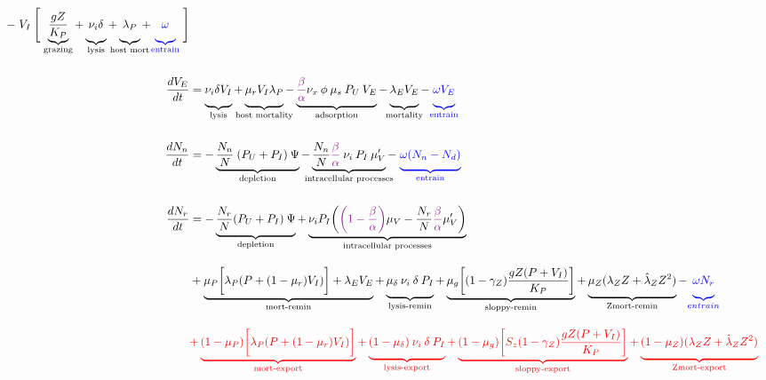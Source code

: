 \documentclass{article}
\begin{document}
\begin{align}
    - \; V_I \: \Biggl[\; \underbrace{\frac{g Z}{K_P}}_{\textrm{grazing}} 
    + \underbrace{\vphantom{\frac{g Z}{K_P}} \nu_i \delta }_{\textrm{lysis}}
    + \underbrace{\vphantom{\frac{g Z}{K_P}} \lambda_P }_{\mathclap{\textrm{host mort}}} 
    + {\color{blue}\underbrace{\vphantom{\frac{g Z}{K_P}} \omega }_{\textrm{entrain}}} \; \Biggr] \\[15pt]
    \frac{dV_E}{dt} &= \underbrace{\vphantom{\frac{g Z}{K_P}} \nu_i \delta V_I}_{\text{lysis}} + \underbrace{\vphantom{\frac{g Z}{K_P}} \mu_r V_I \lambda_P }_{\mathclap{\text{host mortality}}}
    - \underbrace{\vphantom{\frac{g Z}{K_P}} \textcolor{Plum}{\frac{\beta}{\alpha}} \nu_x \: \phi \: \mu_s \: P_U \: V_E}_{\text{adsorption}}
    - \underbrace{\vphantom{\frac{g Z}{K_P}} \lambda_E V_E}_{\mathclap{\text{mortality}}} 
    - {\color{blue}\underbrace{\vphantom{\frac{g Z}{K_P}} \omega V_E}_{\text{entrain}}} \\[15pt]
    \frac{dN_n}{dt} &= - \underbrace{\frac{N_n}{N} \: (P_U + P_I) \: \Psi}_{\text{depletion}}
    - \underbrace{\frac{N_n}{N} \textcolor{Plum}{\frac{\beta}{\alpha}} \: \nu_i \: P_I  \: \mu_V'}_{\mathclap{\text{intracellular processes}}} 
    - \; {\color{blue} \underbrace{\vphantom{\frac{N_n}{N}} \omega(N_n-N_{d})}_{\text{entrain}}} \\[15pt]
    \frac{dN_r}{dt} &=  - \underbrace{\vphantom{\frac{g Z}{K_P}} \frac{N_r}{N} (P_U +  P_I) \: \Psi}_{\text{depletion}}
    + \underbrace{\vphantom{\frac{g Z}{K_P}} \nu_i P_I \biggl(\textcolor{Plum}{\biggl(1 -  \frac{\beta}{\alpha} \biggr)} \mu_V -  \frac{N_r}{N} \textcolor{Plum}{\frac{\beta}{\alpha}} \mu_V' \biggr)}_{\text{intracellular processes}} \\[10pt] 
    &+ \underbrace{\vphantom{\frac{g Z}{K_P}} \mu_P \biggl[ \lambda_P (P + (1- \mu_r) V_I) \biggr] + \lambda_E V_E}_{\text{mort-remin}} 
    + \underbrace{\vphantom{\frac{g Z}{K_P}} \mu_{\delta} \: \nu_i \: \delta \: P_I  }_{\text{lysis-remin}} 
    + \underbrace{\vphantom{\frac{g Z}{K_P}} \mu_g \biggl[(1 -  \gamma_Z) \frac{g Z (P+V_I)}{K_P} \biggr]}_{\text{sloppy-remin}} 
    + \underbrace{\vphantom{\frac{g Z}{K_P}} \mu_Z(\lambda_Z Z + \hat{\lambda}_Z Z^{2})}_{\text{Zmort-remin}} 
    - {\color{blue}\underbrace{\vphantom{\frac{g Z}{K_P}} \omega N_r}_{entrain}} \nonumber \\[10pt]  
    & {\color{red} + \underbrace{\vphantom{\frac{g Z}{K_P}} (1 - \mu_P) \biggl[ \lambda_P (P +  (1 - \mu_r) V_I) \biggr]}_{\text{mort-export}} 
    + \underbrace{\vphantom{\frac{g Z}{K_P}} (1 - \mu_{\delta}) \: \nu_i \: \delta \: P_I}_{\text{lysis-export}} + \underbrace{\vphantom{\frac{g Z}{K_P}} (1 - \mu_g) \biggl[ {\color{Bittersweet} S_{z}} (1 -  \gamma_Z) \frac{g Z (P + V_I)}{K_P} \biggr]}_{\text{sloppy-export}} 
    + \underbrace{\vphantom{\frac{g Z}{K_P}} (1-\mu_Z)(\lambda_Z Z + \hat{\lambda}_Z Z^{2})}_{\text{Zmort-export}}} \nonumber 
\end{align}
\end{document}
